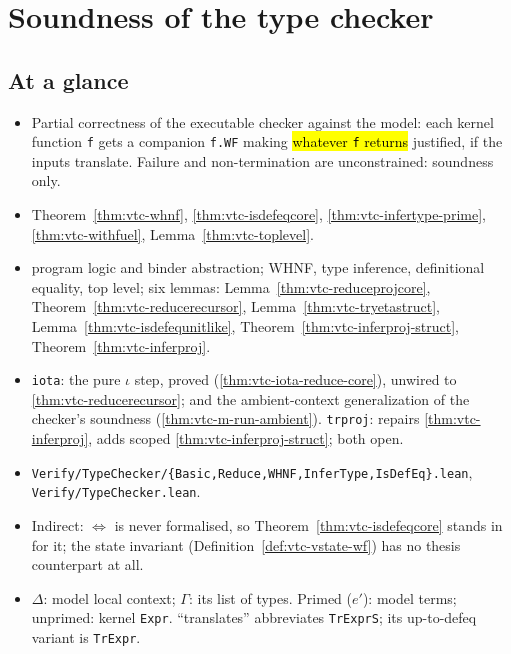 \chapter{Soundness of the type checker}
\label{chap:typechecker}

\section*{At a glance}
\begin{itemize}
\item {} Partial correctness of the executable checker against the model: each kernel
  function \texttt{f} gets a companion \texttt{f.WF} making \hl{whatever \texttt{f} returns}
  justified, if the inputs translate. Failure and non-termination are unconstrained: soundness
  only.
\item {} Theorem~\ref{thm:vtc-whnf}, \ref{thm:vtc-isdefeqcore},
  \ref{thm:vtc-infertype-prime}, \ref{thm:vtc-withfuel}, Lemma~\ref{thm:vtc-toplevel}.
\item {} \stProved{} program logic and binder abstraction; \stTainted{} WHNF, type
  inference, definitional equality, top level; \stSorry{} six lemmas:
  Lemma~\ref{thm:vtc-reduceprojcore}, Theorem~\ref{thm:vtc-reducerecursor},
  Lemma~\ref{thm:vtc-tryetastruct}, Lemma~\ref{thm:vtc-isdefequnitlike},
  Theorem~\ref{thm:vtc-inferproj-struct}, Theorem~\ref{thm:vtc-inferproj}.
\item {} \texttt{iota}: the pure $\iota$ step, proved
  (\ref{thm:vtc-iota-reduce-core}), unwired to \ref{thm:vtc-reducerecursor}; and the
  ambient-context generalization of the checker's soundness (\ref{thm:vtc-m-run-ambient}).
  \texttt{trproj}: repairs \ref{thm:vtc-inferproj}, adds scoped \ref{thm:vtc-inferproj-struct};
  both open.
\item {} \texttt{Verify/TypeChecker/\{Basic,Reduce,WHNF,InferType,IsDefEq\}.lean},
  \texttt{Verify/TypeChecker.lean}.
\item {} Indirect: $\Leftrightarrow$ is never formalised, so
  Theorem~\ref{thm:vtc-isdefeqcore} stands in for it; the state invariant
  (Definition~\ref{def:vtc-vstate-wf}) has no thesis counterpart at all.
\item {} $\Delta$: model local context; $\Gamma$: its list of types. Primed ($e'$):
  model terms; unprimed: kernel \texttt{Expr}. ``translates'' abbreviates \texttt{TrExprS}; its
  up-to-defeq variant is \texttt{TrExpr}.
\end{itemize}

